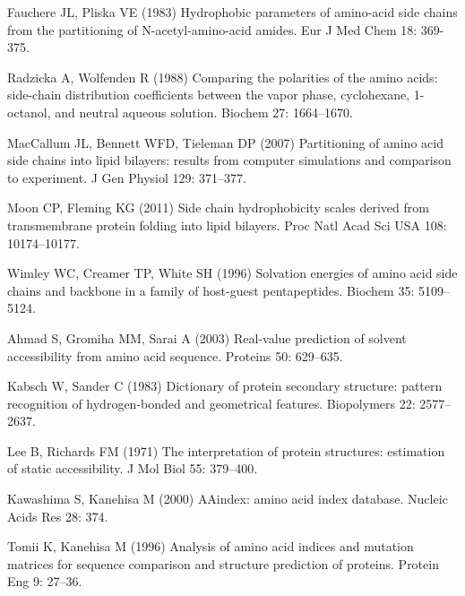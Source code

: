 \documentclass[11pt]{article}
\begin{document}
\begin{thebibliography}{10}
Fauchere JL, Pliska VE (1983) Hydrophobic parameters of amino-acid side chains
  from the partitioning of {N-acetyl-amino-acid} amides.
\newblock Eur J Med Chem 18: 369-375.

Radzicka A, Wolfenden R (1988) Comparing the polarities of the amino acids:
  side-chain distribution coefficients between the vapor phase, cyclohexane,
  1-octanol, and neutral aqueous solution.
\newblock Biochem 27: 1664--1670.

MacCallum JL, Bennett WFD, Tieleman DP (2007) Partitioning of amino acid side
  chains into lipid bilayers: results from computer simulations and comparison
  to experiment.
\newblock J Gen Physiol 129: 371--377.

Moon CP, Fleming KG (2011) Side chain hydrophobicity scales derived from
  transmembrane protein folding into lipid bilayers.
\newblock Proc Natl Acad Sci USA 108: 10174--10177.

Wimley WC, Creamer TP, White SH (1996) Solvation energies of amino acid side
  chains and backbone in a family of host-guest pentapeptides.
\newblock Biochem 35: 5109--5124.

Ahmad S, Gromiha MM, Sarai A (2003) Real-value prediction of solvent
  accessibility from amino acid sequence.
\newblock Proteins 50: 629--635.

Kabsch W, Sander C (1983) Dictionary of protein secondary structure: pattern
  recognition of hydrogen-bonded and geometrical features.
\newblock Biopolymers 22: 2577--2637.

Lee B, Richards FM (1971) The interpretation of protein structures: estimation
  of static accessibility.
\newblock J Mol Biol 55: 379--400.

Kawashima S, Kanehisa M (2000) {AAindex:} amino acid index database.
\newblock Nucleic Acids Res 28: 374.

Tomii K, Kanehisa M (1996) Analysis of amino acid indices and mutation matrices
  for sequence comparison and structure prediction of proteins.
\newblock Protein Eng 9: 27--36.


\end{thebibliography}
\end{document}
